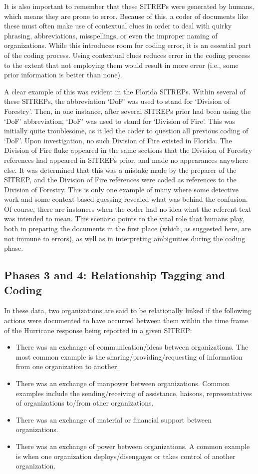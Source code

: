 \documentclass[11pt]{article}
\begin{document}
It is also important to remember that these SITREPs were generated by humans, which means they are prone to error.  Because of this, a coder of documents like these must often make use of contextual clues in order to deal with quirky phrasing, abbreviations, misspellings, or even the improper naming of organizations.  While this introduces room for coding error, it is an essential part of the coding process.  Using contextual clues reduces error in the coding process to the extent that not employing them would result in more error (i.e., some prior information is better than none).

A clear example of this was evident in the Florida SITREPs.  Within several of these SITREPs, the abbreviation `DoF' was used to stand for `Division of Forestry'.  Then, in one instance, after several SITREPs prior had been using the `DoF' abbreviation, `DoF' was used to stand for `Division of Fire'.  This was initially quite troublesome, as it led the coder to question all previous coding of `DoF'.  Upon investigation, no such Division of Fire existed in Florida.  The Division of Fire fluke appeared in the same sections that the Division of Forestry references had appeared in SITREPs prior, and made no appearances anywhere else.  It was determined that this was a mistake made by the preparer of the SITREP, and the Division of Fire references were coded as references to the Division of Forestry.  This is only one example of many where some detective work and some context-based guessing revealed what was behind the confusion.  Of course, there are instances when the coder had no idea what the referent text was intended to mean.  This scenario points to the vital role that humans play, both in preparing the documents in the first place (which, as suggested here, are not immune to errors), as well as in interpreting ambiguities during the coding phase.

\subsection{Phases 3 and 4: Relationship Tagging and Coding}
In these data, two organizations are said to be relationally linked if the following actions were documented to have occurred between them within the time frame of the Hurricane response being reported in a given SITREP:
\begin{itemize}
\item There was an exchange of communication/ideas between organizations.  The most common example is the sharing/providing/requesting of information from one organization to another.
\item There was an exchange of manpower between organizations.  Common examples include the sending/receiving of assistance, liaisons, representatives of organizations to/from other organizations.
\item There was an exchange of material or financial support between organizations.
\item There was an exchange of power between organizations.  A common example is when one organization deploys/disengages or takes control of another organization.
\end{itemize}
\end{document}

